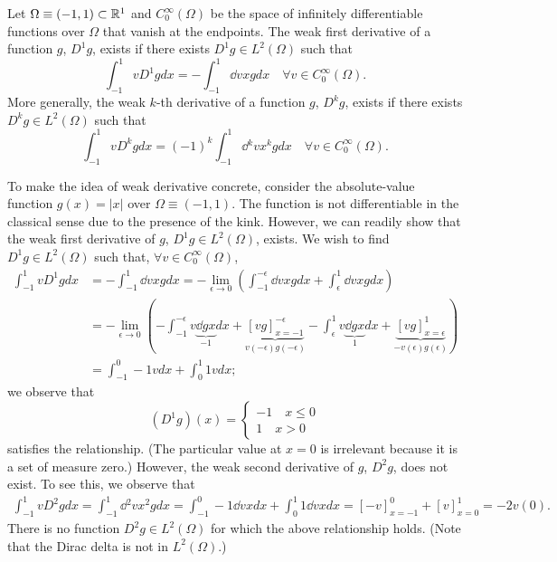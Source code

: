 \begin{definition}
  Let $\Omega \equiv (-1,1) \subset \mathbb{R}^1$ and $C^\infty_0(\Omega)$ be the space of infinitely differentiable functions over $\Omega$ that vanish at the endpoints. The weak first derivative of a function $g$, $D^1g$, exists if there exists $D^1g \in L^2(\Omega)$ such that
\begin{equation*}
  \int_{-1}^1 v D^1 g dx = - \int_{-1}^1 \dd{v}{x} g dx \quad \forall v \in C^\infty_0(\Omega).
\end{equation*}
More generally, the weak $k$-th derivative of a function $g$, $D^kg$, exists if there exists $D^kg \in L^2(\Omega)$ such that
\begin{equation*}
  \int_{-1}^1 v D^k g dx = (-1)^k \int_{-1}^1 \dd{^kv}{x^k} g dx \quad \forall v \in C^\infty_0(\Omega).
\end{equation*}
\end{definition}

To make the idea of weak derivative concrete, consider the absolute-value function $g(x) = |x|$ over $\Omega \equiv (-1,1)$.  The function is not differentiable in the classical sense due to the presence of the kink.  However, we can readily show that the weak first derivative of $g$, $D^1g \in L^2(\Omega)$, exists.  We wish to find $D^1 g \in L^2(\Omega)$ such that, $\forall v \in C^\infty_0(\Omega)$, 
\begin{align*}
  \int_{-1}^1 v D^1 g dx
  &=
  - \int_{-1}^1 \dd{v}{x} g dx
  =
  - \lim_{\epsilon \to 0} ( \int_{-1}^{-\epsilon} \dd{v}{x} g dx
  + \int_{\epsilon}^1 \dd{v}{x} g dx )
  \\
  &=
  - \lim_{\epsilon \to 0} (-\int_{-1}^{-\epsilon} v \underbrace{ \dd{g}{x} }_{-1}dx + \underbrace{[vg]_{x=-1}^{-\epsilon}}_{v(-\epsilon)g(-\epsilon)}
  - \int_{\epsilon}^1 v \underbrace{ \dd{g}{x} }_{1} dx + \underbrace{[vg]_{x=\epsilon}^1}_{-v(\epsilon)g(\epsilon)} )
  \\
  &=
   \int_{-1}^{0} -1 v  dx +  \int_{0}^1 1 v dx;  %
\end{align*}
we observe that 
\begin{equation*}
  (D^1 g)(x) = \begin{cases}
    -1 \quad x \leq 0 \\
    1 \quad x > 0
  \end{cases}
\end{equation*}
satisfies the relationship. (The particular value at $x = 0$ is irrelevant because it is a set of measure zero.) However, the weak second derivative of $g$, $D^2g$, does not exist. To see this, we observe that
\begin{align*}
  \int_{-1}^1 v D^2 g dx
  =
  \int_{-1}^1 \dd{^2v}{x^2} g dx
  =
  \int_{-1}^0 -1 \dd{v}{x} dx + \int_{0}^1 1 \dd{v}{x} dx
  =
  [-v]_{x=-1}^0 + [v]_{x=0}^1
  =
  -2v(0).
\end{align*}
There is no function $D^2g \in L^2(\Omega)$ for which the above relationship holds.  (Note that the Dirac delta is not in $L^2(\Omega)$.)  %

